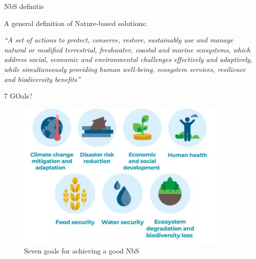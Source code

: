 NbS definitie

A general definition of Nature-based solutions:

\textit{“A set of actions to protect, conserve, restore, sustainably
use and manage natural or modified terrestrial, freshwater, coastal and marine
ecosystems, which address social, economic and environmental challenges
effectively and adaptively, while simultaneously providing human well-being,
ecosystem services, resilience and biodiversity benefits” \autocite{eiselinVerenigdeNatiesStemmen2022}}

7 GOals?

\begin{figure}[H]
    \centering
    \includegraphics[width=0.50\linewidth]{figures/ThesevenNBSgoals.png}
    \caption{Seven goals for achieving a good NbS \autocite{dunlopEvolutionFutureResearch}}
    \label{fig:7g}
\end{figure}
